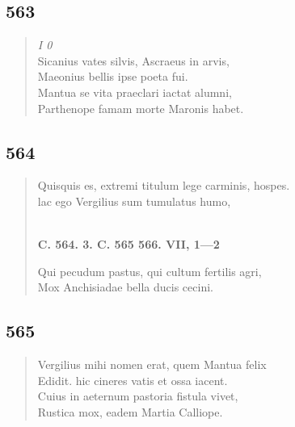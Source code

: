 \documentclass[11pt, a4paper]{report}
\begin{document}
            \subsection*{563}
      \begin{verse}
      \textit{I 0} \\ Sicanius vates silvis, Ascraeus in arvis, \\ Maeonius bellis ipse poeta fui. \\ Mantua se vita praeclari iactat alumni, \\ Parthenope famam morte Maronis habet. \\ 
      \end{verse}
  
            \subsection*{564}
      \begin{verse}
      Quisquis es, extremi titulum lege carminis, hospes. \\ lac ego Vergilius sum tumulatus humo, \\ 
        ﻿\pagebreak 
    \begin{center} \textbf{C. 564. 3. C. 565 566. VII, 1—2} \end{center} \marginpar{[75]} Qui pecudum pastus, qui cultum fertilis agri, \\ Mox Anchisiadae bella ducis cecini. \\ 
      \end{verse}
  
            \subsection*{565}
      \begin{verse}
      Vergilius mihi nomen erat, quem Mantua felix \\ Edidit. hic cineres vatis et ossa iacent. \\ Cuius in aeternum pastoria fistula vivet, \\ Rustica mox, eadem Martia Calliope. \\ 
      \end{verse}
  
\end{document}
